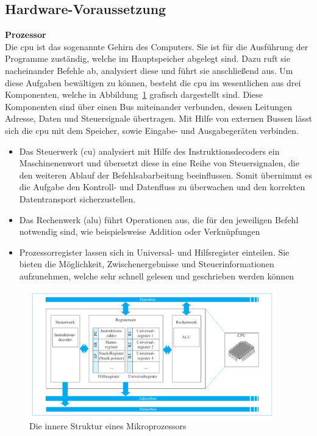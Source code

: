 \subsection{Hardware-Voraussetzung}\label{kap:hardwarevoraussetzung}

\textbf{Prozessor}\\
Die \ac{cpu} ist das sogenannte Gehirn des Computers. Sie ist für die Ausführung der Programme zuständig, welche im Hauptspeicher abgelegt sind. Dazu ruft sie nacheinander
Befehle ab, analysiert diese und führt sie anschließend aus. Um diese Aufgaben bewältigen zu können, besteht die \ac{cpu} im wesentlichen aus drei Komponenten, welche
in Abbildung~\ref{fig:cpu} grafisch dargestellt sind. Diese Komponenten sind über einen Bus miteinander verbunden, dessen Leitungen Adresse, Daten und Steuersignale übertragen. Mit Hilfe von externen Bussen lässt sich die \ac{cpu} mit dem Speicher, sowie Eingabe- und Ausgabegeräten
verbinden.~\cite{cache}
\begin{itemize}
  \item Das Steuerwerk (\ac{cu}) analysiert mit Hilfe des Instruktionsdecoders ein Maschinenenwort und übersetzt diese in eine Reihe von Steuersignalen, die den weiteren
        Ablauf der Befehlsabarbeitung beeinflussen. Somit übernimmt es die Aufgabe den Kontroll- und Datenfluss zu überwachen und den korrekten Datentransport sicherzustellen.~\cite{benchmark}
  \item Das Rechenwerk (\ac{alu}) führt Operationen aus, die für den jeweiligen Befehl notwendig sind, wie beispielsweise Addition oder Verknüpfungen~\cite{benchmark}
  \item Prozessorregister lassen sich in Universal- und Hilfsregister einteilen. Sie bieten die Möglichkeit, Zwischenergebnisse und Steuerinformationen aufzunehmen,
        welche sehr schnell gelesen und geschrieben werden können~\cite{benchmark}
\end{itemize}

\begin{figure}[H]
\centering
\includegraphics[width=0.95\textwidth]{Hauptteil/cpu.png}
\caption{Die innere Struktur eines Mikroprozessors~\cite{benchmark}}\label{fig:cpu}
\end{figure}


